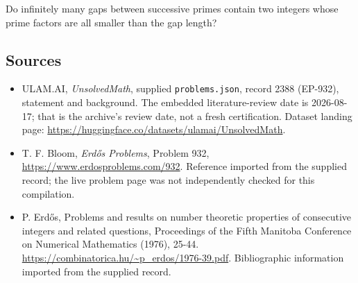 \documentclass[11pt,a4paper]{article}
\begin{document}
Do infinitely many gaps between successive primes contain two integers whose prime factors are all smaller than the gap length?

\subsection{Sources}

{\small

\begin{itemize}

\item[\hypertarget{source:2388:1}{S1}] ULAM.AI, \emph{UnsolvedMath}, supplied \texttt{problems.json}, record 2388 (EP-932), statement and background. The embedded literature-review date is 2026-08-17; that is the archive’s review date, not a fresh certification. Dataset landing page: \url{https://huggingface.co/datasets/ulamai/UnsolvedMath}.

\item[\hypertarget{source:2388:2}{S2}] T. F. Bloom, \emph{Erdős Problems}, Problem 932, \url{https://www.erdosproblems.com/932}. Reference imported from the supplied record; the live problem page was not independently checked for this compilation.

\item[\hypertarget{source:2388:3}{S3}] P. Erdős, Problems and results on number theoretic properties of consecutive integers and related questions, Proceedings of the Fifth Manitoba Conference on Numerical Mathematics (1976), 25-44. \url{https://combinatorica.hu/~p_erdos/1976-39.pdf}. Bibliographic information imported from the supplied record.

\end{itemize}

}

\label{end:2388}
\end{document}
